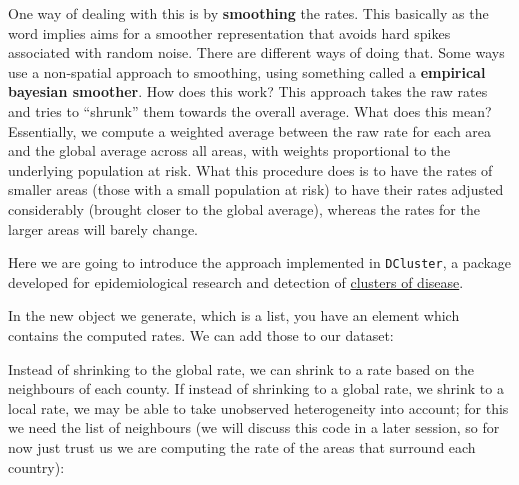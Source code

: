 \documentclass[]{book}
\newenvironment{Shaded}{\begin{snugshade}}{\end{snugshade}}
\newcommand{\DecValTok}[1]{\textcolor[rgb]{0.00,0.00,0.81}{#1}}
\newcommand{\KeywordTok}[1]{\textcolor[rgb]{0.13,0.29,0.53}{\textbf{#1}}}
\newcommand{\NormalTok}[1]{#1}
\newcommand{\OperatorTok}[1]{\textcolor[rgb]{0.81,0.36,0.00}{\textbf{#1}}}
\newcommand{\StringTok}[1]{\textcolor[rgb]{0.31,0.60,0.02}{#1}}
\begin{document}
One way of dealing with this is by \textbf{smoothing} the rates. This basically as the word implies aims for a smoother representation that avoids hard spikes associated with random noise. There are different ways of doing that. Some ways use a non-spatial approach to smoothing, using something called a \textbf{empirical bayesian smoother}. How does this work? This approach takes the raw rates and tries to ``shrunk'' them towards the overall average. What does this mean? Essentially, we compute a weighted average between the raw rate for each area and the global average across all areas, with weights proportional to the underlying population at risk. What this procedure does is to have the rates of smaller areas (those with a small population at risk) to have their rates adjusted considerably (brought closer to the global average), whereas the rates for the larger areas will barely change.

Here we are going to introduce the approach implemented in \texttt{DCluster}, a package developed for epidemiological research and detection of \href{https://www.r-project.org/conferences/DSC-2003/Proceedings/GomezRubioEtAl.pdf}{clusters of disease}.

\begin{Shaded}
\end{Shaded}

In the new object we generate, which is a list, you have an element which contains the computed rates. We can add those to our dataset:

\begin{Shaded}
\end{Shaded}

Instead of shrinking to the global rate, we can shrink to a rate based on the neighbours of each county. If instead of shrinking to a global rate, we shrink to a local rate, we may be able to take unobserved heterogeneity into account; for this we need the list of neighbours (we will discuss this code in a later session, so for now just trust us we are computing the rate of the areas that surround each country):
\end{document}
